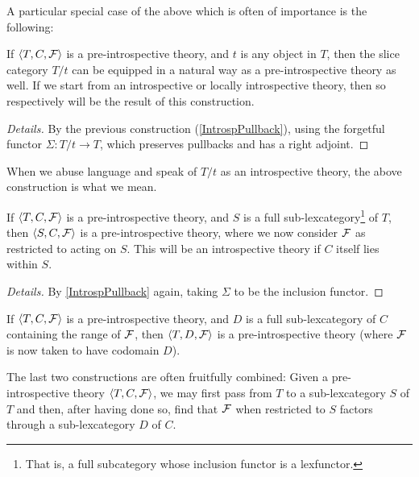 \documentclass[./main.tex]{subfiles}
\begin{document}
A particular special case of the above which is often of importance is the following:

\begin{construction}\label{IntrospSlice}
If $\langle T, C, \mathcal{F} \rangle$ is a pre-introspective theory, and $t$ is any object in $T$, then the slice category $T/t$ can be equipped in a natural way as a pre-introspective theory as well. If we start from an introspective or locally introspective theory, then so respectively will be the result of this construction.
\end{construction}
\begin{proof}[Details]
By the previous construction (\cref{IntrospPullback}), using the forgetful functor $\Sigma : T/t \to T$, which preserves pullbacks and has a right adjoint.
\end{proof}

When we abuse language and speak of $T/t$ as an introspective theory, the above construction is what we mean.

\begin{construction}\label{SubPreIntrosp}
If $\langle T, C, \mathcal{F} \rangle$ is a pre-introspective theory, and $S$ is a full sub-lexcategory\footnote{That is, a full subcategory whose inclusion functor is a lexfunctor.} of $T$, then $\langle S, C, \mathcal{F} \rangle$ is a pre-introspective theory, where we now consider $\mathcal{F}$ as restricted to acting on $S$. This will be an introspective theory if $C$ itself lies within $S$.
\end{construction}
\begin{proof}[Details]
By \cref{IntrospPullback} again, taking $\Sigma$ to be the inclusion functor.
\end{proof}

\begin{construction}\label{SubCPreIntrosp}
If $\langle T, C, \mathcal{F} \rangle$ is a pre-introspective theory, and $D$ is a full sub-lexcategory of $C$ containing the range of $\mathcal{F}$, then $\langle T, D, \mathcal{F} \rangle$ is a pre-introspective theory (where $\mathcal{F}$ is now taken to have codomain $D$).
\end{construction}

The last two constructions are often fruitfully combined: Given a pre-introspective theory $\langle T, C, \mathcal{F} \rangle$, we may first pass from $T$ to a sub-lexcategory $S$ of $T$ and then, after having done so, find that $\mathcal{F}$ when restricted to $S$ factors through a sub-lexcategory $D$ of $C$.
\end{document}
